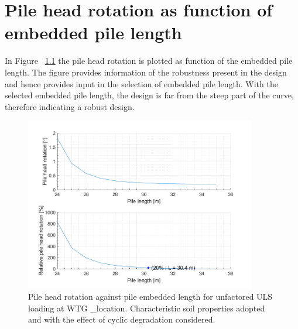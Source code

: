 \chapter{Pile head rotation as function of embedded pile length}\label{sec_3}


In Figure ~\ref{pilehead_vs_length} the pile head rotation is plotted as function of the embedded pile length. The figure provides information of the robustness present in the design and hence provides input in the selection of embedded pile length. With the selected embedded pile length, the design is far from the steep part of the curve, therefore indicating a robust design.

\begin{figure}[!htbp]
\includegraphics[width=0.9\textwidth]{AppendixGenerationFiles/ProjectLocation/pilehead_vs_length.png}
\caption{Pile head rotation against pile embedded length for unfactored ULS loading at WTG {\ID_location}. Characteristic soil properties adopted and with the effect of cyclic degradation considered.}
\label{pilehead_vs_length}\end{figure}
